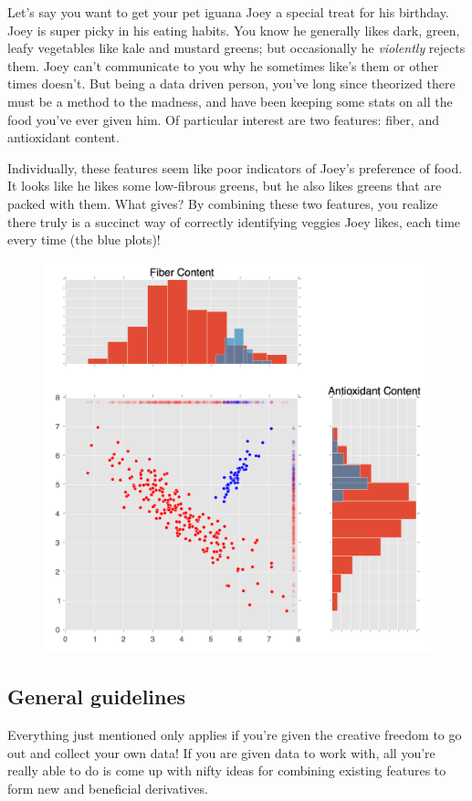 \documentclass{article}
\begin{document}
\par Let's say you want to get your pet iguana Joey a special treat for his birthday. Joey is super picky in his eating habits. You know he generally likes dark, green, leafy vegetables like kale and mustard greens; but occasionally he {\it{violently}} rejects them. Joey can't communicate to you why he sometimes like's them or other times doesn't. But being a data driven person, you've long since theorized there must be a method to the madness, and have been keeping some stats on all the food you've ever given him. Of particular interest are two features: fiber, and antioxidant content.

\par Individually, these features seem like poor indicators of Joey's preference of food. It looks like he likes some low-fibrous greens, but he also likes greens that are packed with them. What gives? By combining these two features, you realize there truly is a succinct way of correctly identifying veggies Joey likes, each time every time (the blue plots)!

\begin{figure}[H]
\centering
\includegraphics[width=.8\linewidth]{pic/feature-importance.png}
\end{figure}

\subsection{General guidelines}
\par Everything just mentioned only applies if you're given the creative freedom to go out and collect your own data! If you are given data to work with, all you're really able to do is come up with nifty ideas for combining existing features to form new and beneficial derivatives.
\end{document}
